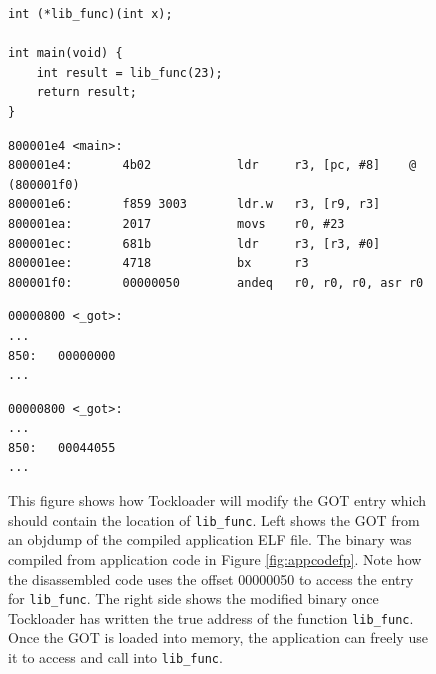 \documentclass[12pt]{ucsddissertation}
\begin{document}
\begin{figure}[h!]
\begin{verbatim}
int (*lib_func)(int x);

int main(void) {
    int result = lib_func(23);
    return result;
}
\end{verbatim}
    \caption[Application Code with Shared Library Function Pointer]{Application code from Figure \ref{fig:appcode} except modified to have a declaration of \texttt{lib\_func} as a function pointer as per Section \ref{incorrect-plt}.}
    \label{fig:appcodefp}

\begin{verbatim}
800001e4 <main>:
800001e4:       4b02            ldr     r3, [pc, #8]    @ (800001f0)
800001e6:       f859 3003       ldr.w   r3, [r9, r3]
800001ea:       2017            movs    r0, #23
800001ec:       681b            ldr     r3, [r3, #0]
800001ee:       4718            bx      r3
800001f0:       00000050        andeq   r0, r0, r0, asr r0
\end{verbatim}
    \caption[Application Code Disassembly]{Disassembly of application code from Figure \ref{fig:appcodefp}. Assume \texttt{r9} points to the start of the GOT (0x00000800 in the ELF file address space or at runtime: 0x00000800 + application memory start). Note that line at address 800001e4 is loading the constant from address 800001f0. This constant represents the offset into the GOT for the \texttt{lib\_func} function pointer.}
    \label{fig:appcodefpasm}
    \vspace{0.5cm}
 \begin{minipage}{0.47\textwidth}
     \begin{verbatim}
00000800 <_got>:
...
850:   00000000
...
     \end{verbatim}
 \end{minipage}
 \begin{minipage}{0.47\textwidth}
     \begin{verbatim}
00000800 <_got>:
...
850:   00044055
...
     \end{verbatim}
 \end{minipage}
    \caption[GOT Before/After Tockloader Relocation]{This figure shows how Tockloader will modify the GOT entry which should contain the location of \texttt{lib\_func}. Left shows the GOT from an objdump of the compiled application ELF file. The binary was compiled from application code in Figure \ref{fig:appcodefp}. Note how the disassembled code uses the offset  00000050 to access the entry for \texttt{lib\_func}. The right side shows the modified binary once Tockloader has written the true address of the function \texttt{lib\_func}. Once the GOT is loaded into memory, the application can freely use it to access and call into \texttt{lib\_func}.}
    \label{fig:tockloader-got}
\end{figure}
\end{document}
